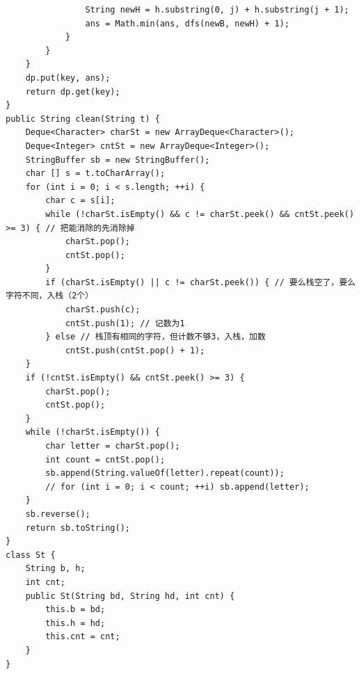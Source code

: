 \documentclass[9pt, b5paaper]{book}
\begin{document}
\begin{enumerate}
\begin{verbatim}
                String newH = h.substring(0, j) + h.substring(j + 1);
                ans = Math.min(ans, dfs(newB, newH) + 1);
            }
        }
    }
    dp.put(key, ans);
    return dp.get(key);
}
public String clean(String t) {
    Deque<Character> charSt = new ArrayDeque<Character>();
    Deque<Integer> cntSt = new ArrayDeque<Integer>();
    StringBuffer sb = new StringBuffer();
    char [] s = t.toCharArray();
    for (int i = 0; i < s.length; ++i) {
        char c = s[i];
        while (!charSt.isEmpty() && c != charSt.peek() && cntSt.peek() >= 3) { // 把能消除的先消除掉
            charSt.pop();
            cntSt.pop();
        }
        if (charSt.isEmpty() || c != charSt.peek()) { // 要么栈空了，要么字符不同，入栈（2个）
            charSt.push(c);
            cntSt.push(1); // 记数为1
        } else // 栈顶有相同的字符，但计数不够3，入栈，加数
            cntSt.push(cntSt.pop() + 1);
    }
    if (!cntSt.isEmpty() && cntSt.peek() >= 3) {
        charSt.pop();
        cntSt.pop();
    }
    while (!charSt.isEmpty()) {
        char letter = charSt.pop();
        int count = cntSt.pop();
        sb.append(String.valueOf(letter).repeat(count));
        // for (int i = 0; i < count; ++i) sb.append(letter);
    }
    sb.reverse();
    return sb.toString();
}
class St {
    String b, h;
    int cnt;
    public St(String bd, String hd, int cnt) {
        this.b = bd;
        this.h = hd;
        this.cnt = cnt;
    }
}
\end{verbatim}
\end{enumerate}
\end{document}
